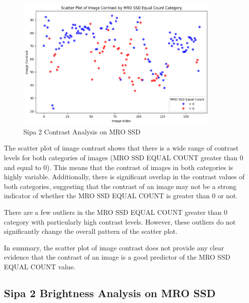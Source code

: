 \begin{figure}[ht]
    \centering
    \includegraphics[width=0.9\textwidth]{Figures/Results/sipa_02/contrast.png}
    \caption[Sipa 2 Contrast Analysis on MRO SSD]{Sipa 2 Contrast Analysis on MRO SSD}
    \label{fig:Sipa 2 Contrast Analysis on MRO SSD}
\end{figure}

The scatter plot of image contrast shows that there is a wide range of contrast levels for both categories of images (MRO SSD EQUAL COUNT greater than 0 and equal to 0). This means that the contrast of images in both categories is highly variable. Additionally, there is significant overlap in the contrast values of both categories, suggesting that the contrast of an image may not be a strong indicator of whether the MRO SSD EQUAL COUNT is greater than 0 or not.

There are a few outliers in the MRO SSD EQUAL COUNT greater than 0 category with particularly high contrast levels. However, these outliers do not significantly change the overall pattern of the scatter plot.

In summary, the scatter plot of image contrast does not provide any clear evidence that the contrast of an image is a good predictor of the MRO SSD EQUAL COUNT value.

\newpage

\subsection{Sipa 2 Brightness Analysis on MRO SSD}


